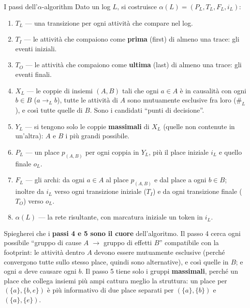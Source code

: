 \begin{definizione}{I passi dell'$\alpha$-algorithm}
Dato un log $L$, si costruisce $\alpha(L) = (P_L, T_L, F_L, i_L)$:
\begin{enumerate}
  \item \textbf{$T_L$} — una transizione per ogni attività che compare nel log.
  \item \textbf{$T_I$} — le attività che compaiono come \textbf{prima} (first) di almeno una trace: gli eventi iniziali.
  \item \textbf{$T_O$} — le attività che compaiono come \textbf{ultima} (last) di almeno una trace: gli eventi finali.
  \item \textbf{$X_L$} — le coppie di insiemi $(A,B)$ tali che ogni $a\in A$ è in causalità con ogni $b\in B$ ($a\to_L b$), tutte le attività di $A$ sono mutuamente esclusive fra loro ($\#_L$), e così tutte quelle di $B$. Sono i candidati ``punti di decisione''.
  \item \textbf{$Y_L$} — si tengono solo le coppie \textbf{massimali} di $X_L$ (quelle non contenute in un'altra): $A$ e $B$ i più grandi possibile.
  \item \textbf{$P_L$} — un place $p_{(A,B)}$ per ogni coppia in $Y_L$, più il place iniziale $i_L$ e quello finale $o_L$.
  \item \textbf{$F_L$} — gli archi: da ogni $a\in A$ al place $p_{(A,B)}$ e dal place a ogni $b\in B$; inoltre da $i_L$ verso ogni transizione iniziale ($T_I$) e da ogni transizione finale ($T_O$) verso $o_L$.
  \item \textbf{$\alpha(L)$} — la rete risultante, con marcatura iniziale un token in $i_L$.
\end{enumerate}
\end{definizione}

Spiegherei che i \textbf{passi 4 e 5 sono il cuore} dell'algoritmo. Il passo 4 cerca ogni possibile ``gruppo di cause $A$ $\to$ gruppo di effetti $B$'' compatibile con la footprint: le attività dentro $A$ devono essere mutuamente esclusive (perché convergono tutte sullo stesso place, quindi sono alternative), e così quelle in $B$; e ogni $a$ deve causare ogni $b$. Il passo 5 tiene solo i gruppi \textbf{massimali}, perché un place che collega insiemi più ampi cattura meglio la struttura: un place per $(\{a\},\{b,e\})$ è più informativo di due place separati per $(\{a\},\{b\})$ e $(\{a\},\{e\})$.

